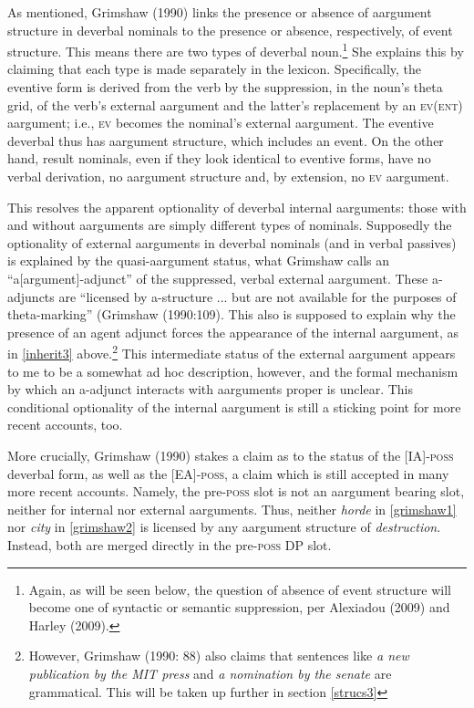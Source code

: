 \documentclass[12pt]{article}
\begin{document}
As mentioned, Grimshaw (1990) links the presence or absence of aargument structure in deverbal nominals to the presence or absence, respectively, of event structure. This means there are two types of deverbal noun.\footnote{ Again, as will be seen below, the question of absence of event structure will become one of syntactic or semantic suppression, per Alexiadou (2009) and Harley (2009).} She explains this by claiming that each type is made separately in the lexicon. Specifically, the eventive form is derived from the verb by the suppression, in the noun's theta grid, of the verb's external aargument and the latter's replacement by an \textsc{ev(ent)} aargument; i.e., \textsc{ev} becomes the nominal's external aargument. The eventive deverbal thus has aargument structure, which includes an event. On the other hand, result nominals, even if they look identical to eventive forms, have no verbal derivation, no aargument structure and, by extension, no \textsc{ev} aargument.

This resolves the apparent optionality of deverbal internal aarguments: those with and without aarguments are simply different types of nominals. Supposedly the optionality of external aarguments in deverbal nominals (and in verbal passives) is explained by the quasi-aargument status, what Grimshaw calls an ``a[argument]-adjunct'' of the suppressed, verbal external aargument. These a-adjuncts are ``licensed by a-structure ... but are not available for the purposes of theta-marking'' (Grimshaw (1990:109). This also is supposed to explain why the presence of an agent adjunct forces the appearance of the internal aargument, as in \ref{inherit3} above.\footnote{ However, Grimshaw (1990: 88) also claims that sentences like \textit{a new publication by the MIT press} and \textit{a nomination by the senate} are grammatical. This will be taken up further in section \ref{strucs3}} This intermediate status of the external aargument appears to me to be a somewhat ad hoc description, however, and the formal mechanism by which an a-adjunct interacts with aarguments proper is unclear. This conditional optionality of the internal aargument is still a sticking point for more recent accounts, too.

More crucially, Grimshaw (1990) stakes a claim as to the status of the [IA]-\textsc{poss} deverbal form, as well as the [EA]-\textsc{poss}, a claim which is still accepted in many more recent accounts. Namely, the pre-\textsc{poss} slot is not an aargument bearing slot, neither for internal nor external aarguments. Thus, neither \textit{horde} in \ref{grimshaw1} nor \textit{city} in \ref{grimshaw2} is licensed by any aargument structure of \textit{destruction}. Instead, both are merged directly in the pre-\textsc{poss} DP slot.
\end{document}
